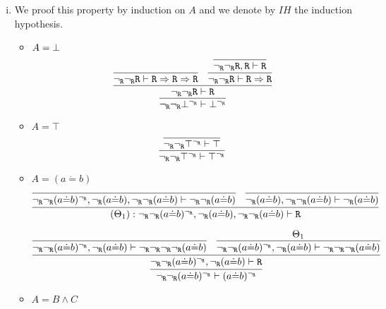 \begin{enumerate}[(i)]
    \item We proof this property by induction on $A$ and we denote by $IH$ the induction hypothesis.
    \begin{itemize}
        \item $A=\bot$
            $$
                \infer{
                    \neg_\R\neg_\R \bottom^{\neg_\R} \vdash \bottom^{\neg_\R}
                }{
                    \infer{
                        \neg_\R\neg_\R \R \vdash \R
                    }{
                        \infer{
                            \neg_\R\neg_\R \R \vdash \R\Rightarrow\R\Rightarrow\R
                        }{
                        }&
                        \infer{
                            \neg_\R\neg_\R \R \vdash \R\Rightarrow\R
                        }{
                            \infer{
                                \neg_\R\neg_\R \R, \R \vdash \R
                            }{
                            }
                        }
                    }
                }
            $$
        \item $A=\top$
            $$
                \infer{
                    \neg_\R\neg_\R \top^{\neg_\R} \vdash \top^{\neg_\R}
                }{
                    \infer{
                        \neg_\R\neg_\R \top^{\neg_\R} \vdash \top
                    }{
                    }
                }
            $$
        \item $A=(a \dot{=} b)$
            $$
            \infer{
                                (\Theta_1) : \neg_\R \neg_\R (a \dot{=} b)^{\neg_\R}, \neg_\R(a \dot{=} b), \neg_\R \neg_\R (a \dot{=} b) \vdash \R
                            }{
                                \infer{
                                    \neg_\R \neg_\R (a \dot{=} b)^{\neg_\R}, \neg_\R(a \dot{=} b), \neg_\R \neg_\R (a \dot{=} b) \vdash \neg_\R \neg_\R (a \dot{=} b)
                                }{
                                }&
                                \infer{
                                    \neg_\R(a \dot{=} b), \neg_\R \neg_\R (a \dot{=} b) \vdash \neg_\R (a \dot{=} b)
                                }{
                                }
                            }
            $$
            
            $$
                \infer{
                    \neg_\R \neg_\R (a \dot{=} b)^{\neg_\R} \vdash (a \dot{=} b)^{\neg_\R}
                }{
                    \infer{
                        \neg_\R \neg_\R (a \dot{=} b)^{\neg_\R}, \neg_\R(a \dot{=} b) \vdash \R
                    }{
                        \infer{
                            \neg_\R \neg_\R (a \dot{=} b)^{\neg_\R}, \neg_\R(a \dot{=} b) \vdash \neg_\R \neg_\R \neg_\R \neg_\R (a \dot{=} b)
                        }{
                        }&
                        \infer{
                            \neg_\R \neg_\R (a \dot{=} b)^{\neg_\R}, \neg_\R(a \dot{=} b) \vdash \neg_\R \neg_\R \neg_\R (a \dot{=} b)
                        }{
                            \Theta_1
                        }
                    }
                }
            $$
        \item $A=B\wedge C$
        

\end{itemize}
\end{enumerate}
